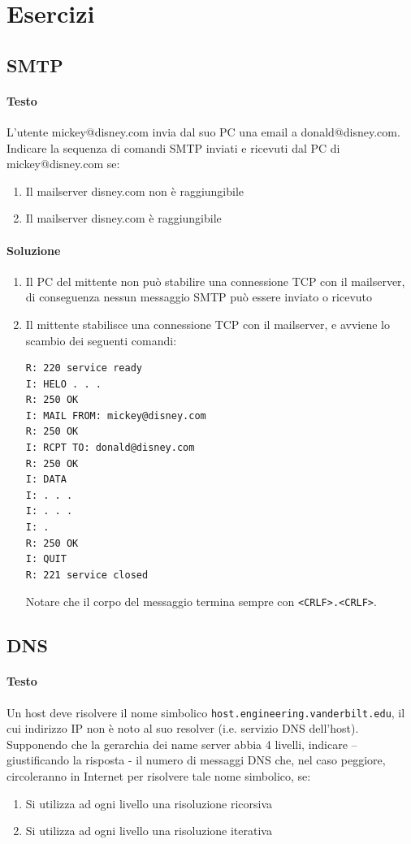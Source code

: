 \documentclass[10pt]{article}
\begin{document}
\section{Esercizi}
\subsection{SMTP}
\paragraph{Testo} L’utente mickey@disney.com invia dal suo PC una email a donald@disney.com.\\
Indicare la sequenza di comandi SMTP inviati e ricevuti dal PC di mickey@disney.com se:
\begin{enumerate}
\item Il mailserver disney.com non è raggiungibile
\item Il mailserver disney.com è raggiungibile
\end{enumerate}
\paragraph{Soluzione}
\begin{enumerate}
\item Il PC del mittente non può stabilire una connessione TCP con il mailserver, di conseguenza nessun messaggio SMTP può essere inviato o ricevuto
\item Il mittente stabilisce una connessione TCP con il mailserver, e avviene lo scambio dei seguenti comandi:
\begin{verbatim}
R: 220 service ready
I: HELO . . .
R: 250 OK
I: MAIL FROM: mickey@disney.com
R: 250 OK
I: RCPT TO: donald@disney.com
R: 250 OK
I: DATA
I: . . .
I: . . .
I: .
R: 250 OK
I: QUIT
R: 221 service closed
\end{verbatim}
Notare che il corpo del messaggio termina sempre con \texttt{<CRLF>.<CRLF>}.
\end{enumerate}
\pagebreak
\subsection{DNS}
\paragraph{Testo} Un host deve risolvere il nome simbolico \texttt{host.engineering.vanderbilt.edu}, il cui indirizzo IP non è noto al suo resolver (i.e. servizio DNS dell’host).\\
Supponendo che la gerarchia dei name server abbia 4 livelli, indicare – giustificando la risposta - il numero di messaggi DNS che, nel caso peggiore, circoleranno in Internet per risolvere tale nome
simbolico, se:
\begin{enumerate}
\item Si utilizza ad ogni livello una risoluzione ricorsiva
\item Si utilizza ad ogni livello una risoluzione iterativa
\end{enumerate}
\end{document}
